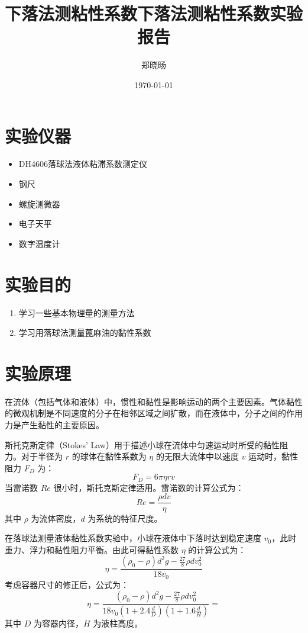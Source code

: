 \documentclass[UTF8]{ctexart}
\title{下落法测粘性系数}
\title{下落法测粘性系数实验报告}
\author{郑晓旸}
\date{\today}
\begin{document}
\fancyfoot[C]{\thepage}

\maketitle
\tableofcontents
\newpage

\section{实验仪器}
\begin{itemize}
    \item DH4606落球法液体粘滞系数测定仪
    \item 钢尺
    \item 螺旋测微器
    \item 电子天平
    \item 数字温度计
\end{itemize}

\section{实验目的}
\begin{enumerate}
    \item 学习一些基本物理量的测量方法
    \item 学习用落球法测量蓖麻油的黏性系数
\end{enumerate}

\section{实验原理}
在流体（包括气体和液体）中，惯性和黏性是影响运动的两个主要因素。气体黏性的微观机制是不同速度的分子在相邻区域之间扩散，而在液体中，分子之间的作用力是产生黏性的主要原因。

斯托克斯定律（Stokes' Law）用于描述小球在流体中匀速运动时所受的黏性阻力。对于半径为 \(r\) 的球体在黏性系数为 \(\eta\) 的无限大流体中以速度 \(v\) 运动时，黏性阻力 \(F_D\) 为：
\[
F_D = 6 \pi \eta r v
\]
当雷诺数 \(Re\) 很小时，斯托克斯定律适用。雷诺数的计算公式为：
\[
Re = \frac{\rho d v}{\eta}
\]
其中 \(\rho\) 为流体密度，\(d\) 为系统的特征尺度。

在落球法测量液体黏性系数实验中，小球在液体中下落时达到稳定速度 \(v_0\)，此时重力、浮力和黏性阻力平衡。由此可得黏性系数 \(\eta\) 的计算公式为：
\[
\eta = \frac{(\rho_0 - \rho) d^2 g - \frac{27}{8} \rho d v_0^2}{18 v_0}
\]
考虑容器尺寸的修正后，公式为：
\[
\eta = \frac{(\rho_0 - \rho) d^2 g - \frac{27}{8} \rho d v_0^2}{18 v_0 (1 + 2.4 \frac{d}{D}) (1 + 1.6 \frac{d}{H})}=
\]
其中 \(D\) 为容器内径，\(H\) 为液柱高度。
\end{document}
